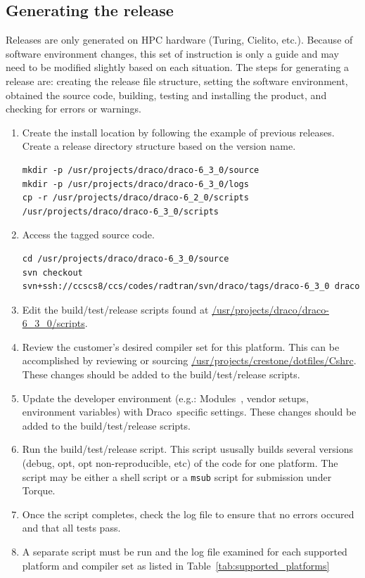 \documentclass[note]{newmemo}
\newcommand{\draco}{{\normalfont\small\sffamily Draco}}
\begin{document}

\subsection{Generating the release}
\label{sec:generating_release}

Releases are only generated on HPC hardware (Turing, Cielito, etc.).
Because of software environment changes, this set of instruction is
only a guide and may need to be modified slightly based on each
situation. The steps for generating a release are: creating the
release file structure, setting the software environment, obtained the
source code, building, testing and installing the product, and
checking for errors or warnings.
%
\begin{enumerate}
\item Create the install location by following the example of previous
  releases.  Create a release directory structure based on the version
  name.
\begin{lstlisting}[basicstyle=\footnotesize, xleftmargin=0.20in, 
  xrightmargin=0.20in]
mkdir -p /usr/projects/draco/draco-6_3_0/source
mkdir -p /usr/projects/draco/draco-6_3_0/logs
cp -r /usr/projects/draco/draco-6_2_0/scripts /usr/projects/draco/draco-6_3_0/scripts
\end{lstlisting}
\item Access the tagged source code.
\begin{lstlisting}[basicstyle=\footnotesize, xleftmargin=0.20in, 
  xrightmargin=0.20in]
cd /usr/projects/draco/draco-6_3_0/source
svn checkout svn+ssh://ccscs8/ccs/codes/radtran/svn/draco/tags/draco-6_3_0 draco
\end{lstlisting}
\item Edit the build/test/release scripts found at
  \url{/usr/projects/draco/draco-6_3_0/scripts}. 
\item Review the customer's desired compiler set for this platform.
  This can be accomplished by reviewing or sourcing
  \url{/usr/projects/crestone/dotfiles/Cshrc}.  These changes should
  be added to the build/test/release scripts.
\item Update the developer environment (e.g.:
  Modules~\cite{modulecmd}, vendor setups, environment variables) with
  \draco\ specific settings.  These changes should be added to the
  build/test/release scripts.
\item Run the build/test/release script. This script ususally builds
  several versions (debug, opt, opt non-reproducible, etc) of the code
  for one platform.  The script may be either a shell script or a
  \texttt{msub} script for submission under Torque.
\item Once the script completes, check the log file to ensure that no
  errors occured and that all tests pass.
\item A separate script must be run and the log file examined for each
  supported platform and compiler set as listed in
  Table~\ref{tab:supported_platforms}
\end{enumerate}
\end{document}
